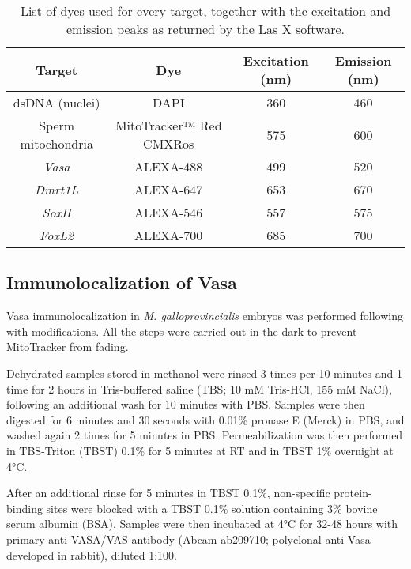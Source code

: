 \begin{table}
	\centering
	\begin{tabular}{@{}cccc@{}}
		\toprule
		\textbf{Target}    & \textbf{Dye}            & \textbf{Excitation (nm)} & \textbf{Emission (nm)} \\
		\midrule \midrule
		dsDNA (nuclei)     & DAPI                    & 360                      & 460                    \\
		Sperm mitochondria & MitoTracker™ Red CMXRos & 575                      & 600                    \\
		\textit{Vasa}      & ALEXA-488               & 499                      & 520                    \\
		\textit{Dmrt1L}    & ALEXA-647               & 653                      & 670                    \\
		\textit{SoxH}      & ALEXA-546               & 557                      & 575                    \\
		\textit{FoxL2}     & ALEXA-700               & 685                      & 700                    \\
		\bottomrule
	\end{tabular}
	\caption{List of dyes used for every target, together with the excitation and emission peaks as returned by the Las X software.}
	\label{tab:imaging}
\end{table}

\subsection{Immunolocalization of Vasa} \label{chapter4_MM_immuno}
Vasa immunolocalization in \textit{M. galloprovincialis} embryos was performed following \textbf{\cite{milani2011doubly}} with modifications. All the steps were carried out in the dark to prevent MitoTracker from fading.

Dehydrated samples stored in methanol were rinsed 3 times per 10 minutes and 1 time for 2 hours in Tris-buffered saline (TBS; 10 mM Tris-HCl, 155 mM NaCl), following an additional wash for 10 minutes with PBS. Samples were then digested for 6 minutes and 30 seconds with 0.01\% pronase E (Merck) in PBS, and washed again 2 times for 5 minutes in PBS. Permeabilization was then performed in TBS-Triton (TBST) 0.1\% for 5 minutes at RT and in TBST 1\% overnight at 4°C.

After an additional rinse for 5 minutes in TBST 0.1\%, non-specific protein-binding sites were blocked with a TBST 0.1\% solution containing 3\% bovine serum albumin (BSA). Samples were then incubated at 4°C for 32-48 hours with primary anti-VASA/VAS antibody (Abcam ab209710; polyclonal anti-Vasa developed in rabbit), diluted 1:100.

